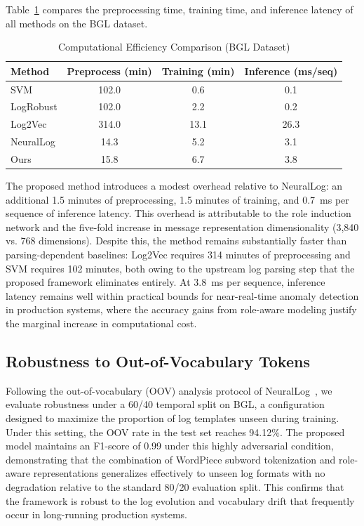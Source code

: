 Table~\ref{tab:efficiency} compares the preprocessing time, training time, and inference latency of all methods on the BGL dataset.

\begin{table}[t]
\centering
\caption{Computational Efficiency Comparison (BGL Dataset)}
\label{tab:efficiency}
\begin{tabular}{@{}lccc@{}}
\toprule
\textbf{Method} & \textbf{Preprocess (min)} & \textbf{Training (min)} &
\textbf{Inference (ms/seq)} \\
\midrule
SVM       & 102.0 & 0.6  & 0.1  \\
LogRobust & 102.0 & 2.2  & 0.2  \\
Log2Vec   & 314.0 & 13.1 & 26.3 \\
NeuralLog & 14.3  & 5.2  & 3.1  \\
Ours      & 15.8  & 6.7  & 3.8  \\
\bottomrule
\end{tabular}
\end{table}

The proposed method introduces a modest overhead relative to NeuralLog: an additional 1.5 minutes of preprocessing, 1.5 minutes of training, and 0.7~ms per sequence of inference latency. This overhead is attributable to the role induction network and the five-fold increase in message representation dimensionality (3,840 vs. 768 dimensions). Despite this, the method remains substantially faster than parsing-dependent baselines: Log2Vec requires 314 minutes of preprocessing and SVM requires 102 minutes, both owing to the upstream log parsing step that the proposed framework eliminates entirely. At 3.8~ms per sequence, inference latency remains well within practical bounds for near-real-time anomaly detection in production systems, where the accuracy gains from role-aware modeling justify the marginal increase in computational cost.

\subsection{Robustness to Out-of-Vocabulary Tokens}

Following the out-of-vocabulary (OOV) analysis protocol of NeuralLog~\cite{neurallog2021}, we evaluate robustness under a 60/40 temporal split on BGL, a configuration designed to maximize the proportion of log templates unseen during training. Under this setting, the OOV rate in the test set reaches 94.12\%. The proposed model maintains an F1-score of 0.99 under this highly adversarial condition, demonstrating that the combination of WordPiece subword tokenization and role-aware representations generalizes effectively to unseen log formats with no degradation relative to the standard 80/20 evaluation split. This confirms that the framework is robust to the log evolution and vocabulary drift that frequently occur in long-running production systems.

